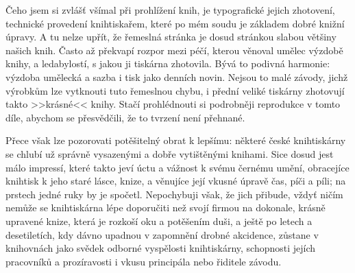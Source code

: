 Čeho jsem si zvlášť všímal při prohlížení knih, je typografické jejich
zhotovení, technické provedení knihtiskařem, které po mém soudu je základem
dobré knižní úpravy. A tu nelze upřít, že řemeslná stránka je dosud stránkou
slabou většiny našich knih. Často až překvapí rozpor mezi péčí, kterou
věnoval umělec výzdobě knihy, a ledabylostí, s jakou ji tiskárna zhotovila.
Bývá to podivná harmonie: výzdoba umělecká a sazba i tisk jako denních
novin. Nejsou to malé závody, jichž výrobkům lze vytknouti tuto řemeslnou
chybu, i přední veliké tiskárny zhotovují takto >>krásné<< knihy. Stačí
prohlédnouti si podrobněji reprodukce v tomto díle, abychom se přesvědčili, 
že to tvrzení není přehnané.

Přece však lze pozorovati potěšitelný obrat k lepšímu: některé české
knihtiskárny se chlubí už správně vysazenými a dobře vytištěnými knihami.
Sice dosud jest málo impressí, které takto jeví úctu a vážnost k svému
černému umění, obracejíce knihtisk k jeho staré lásce, knize, a věnujíce
její vkusné úpravě čas, píči a píli; na prstech jedné ruky by je spočetl.
Nepochybuji však, že jich přibude, vždyť ničím nemůže se knihtiskárna
lépe doporučiti než svojí firmou na dokonale, krásně upravené knize, která
je rozkoší oku a potěšením duši, a ještě po letech a desetiletích, kdy
dávno upadnou v zapomnění drobné akcidence, zůstane v knihovnách jako svědek
odborné vyspělosti knihtiskárny, schopnosti jejích pracovníků
a prozíravosti i vkusu principála nebo řiditele závodu.
